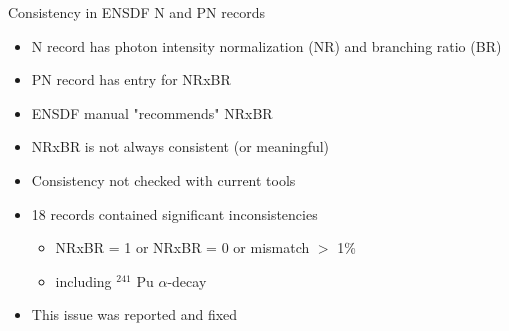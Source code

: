\documentclass[xcolor=x11names,compress]{beamer}
\renewcommand{\(}{\begin{columns}}
\renewcommand{\)}{\end{columns}}
\newcommand{\<}[1]{\begin{column}{#1}}
\renewcommand{\>}{\end{column}}
\begin{document}
\begin{frame}{Consistency in ENSDF N and PN records}
    \begin{itemize}
        \item N record has photon intensity normalization (NR) and branching ratio (BR)
        \item PN record has entry for NRxBR
        \item ENSDF manual "recommends" NRxBR
        \item NRxBR is not always consistent (or meaningful)
        \item Consistency not checked with current tools
        \item 18 records contained significant inconsistencies
        \begin{itemize}
            \item NRxBR = 1 or NRxBR = 0 or mismatch $>$ 1\%
            \item including $^{241}$ Pu $\alpha$-decay
        \end{itemize}
        \item This issue was reported and fixed
    \end{itemize}

\end{frame}
\end{document}

